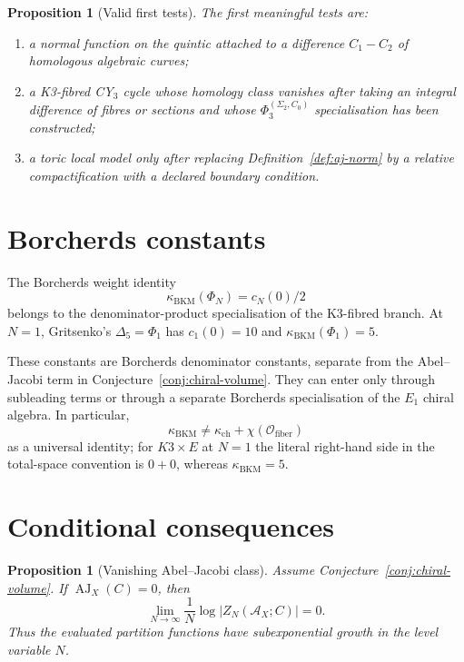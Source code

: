 \documentclass[11pt]{article}
\newtheorem{proposition}[theorem]{Proposition}
\newcommand{\cA}{\mathcal{A}}
\newcommand{\cO}{\mathcal{O}}
\newcommand{\AJ}{\operatorname{AJ}}
\newcommand{\kch}{\kappa_{\mathrm{ch}}}
\begin{document}
\begin{proposition}[Valid first tests]
\label{prop:valid-tests}
The first meaningful tests are:
\begin{enumerate}[label=\textup{(\roman*)}]
\item a normal function on the quintic attached to a difference
  $C_1-C_2$ of homologous algebraic curves;
\item a K3-fibred CY$_3$ cycle whose homology class vanishes after
  taking an integral difference of fibres or sections and whose
  $\Phi_3^{(\Sigma_2,C_0)}$ specialisation has been constructed;
\item a toric local model only after replacing
  Definition~\ref{def:aj-norm} by a relative compactification with a
  declared boundary condition.
\end{enumerate}
\end{proposition}

\section{Borcherds constants}
\label{sec:borcherds}

The Borcherds weight identity
\[
  \kappa_{\mathrm{BKM}}(\Phi_N)=c_N(0)/2
\]
belongs to the denominator-product specialisation of the K3-fibred
branch. At $N=1$, Gritsenko's $\Delta_5=\Phi_1$ has
$c_1(0)=10$ and $\kappa_{\mathrm{BKM}}(\Phi_1)=5$.

These constants are Borcherds denominator constants, separate from the
Abel--Jacobi term in Conjecture~\ref{conj:chiral-volume}. They can enter
only through subleading terms or through a separate Borcherds
specialisation of the $E_1$ chiral algebra. In particular,
\[
  \kappa_{\mathrm{BKM}}
  \ne
  \kch+\chi(\cO_{\mathrm{fiber}})
\]
as a universal identity; for $K3\times E$ at $N=1$ the literal
right-hand side in the total-space convention is $0+0$, whereas
$\kappa_{\mathrm{BKM}}=5$.

\section{Conditional consequences}
\label{sec:consequences}

\begin{proposition}[Vanishing Abel--Jacobi class]
\label{prop:vanishing}
Assume Conjecture~\ref{conj:chiral-volume}. If
$\AJ_X(C)=0$, then
\[
  \lim_{N\to\infty}\frac{1}{N}
  \log |Z_N(\cA_X;C)|
  =
  0.
\]
Thus the evaluated partition functions have subexponential growth in
the level variable $N$.
\end{proposition}
\end{document}
